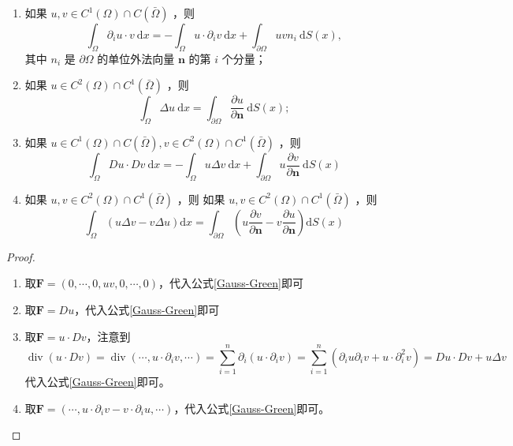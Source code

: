 \documentclass{mynote}
\begin{document}
\begin{corollary}
    \begin{enumerate}
        \item 如果 $u, v \in C^1(\Omega) \cap C(\bar{\Omega})$ ，则
        \begin{equation}
        \int_{\Omega} \partial_i u \cdot v \mathrm{~d} x=-\int_{\Omega} u\cdot \partial_i v \mathrm{~d} x+\int_{\partial \Omega} u v n_i \mathrm{~d} S(x),
        \label{eq:integration_by_parts_1}
        \end{equation}
        其中 $n_i$ 是 $\partial \Omega$ 的单位外法向量 $\boldsymbol{n}$ 的第 $i$ 个分量；
        \item 如果 $u \in C^2(\Omega) \cap C^1(\bar{\Omega})$ ，则
        \begin{equation}
        \int_{\Omega} \Delta u \mathrm{~d} x=\int_{\partial \Omega} \frac{\partial u}{\partial \boldsymbol{n}} \mathrm{~d} S(x) ;
        \label{eq:integration_by_parts_2}
        \end{equation}
        \item 如果 $u \in C^1(\Omega) \cap C(\bar{\Omega}), v \in C^2(\Omega) \cap C^1(\bar{\Omega})$ ，则
        \begin{equation}
        \int_{\Omega} D u \cdot D v \mathrm{~d} x=-\int_{\Omega} u \Delta v \mathrm{~d} x+\int_{\partial \Omega} u \frac{\partial v}{\partial \boldsymbol{n}} \mathrm{~d} S(x)
        \label{eq:integration_by_parts_3}
        \end{equation}
        \item 如果 $u, v \in C^2(\Omega) \cap C^1(\bar{\Omega})$ ，则
        如果 $u, v \in C^2(\Omega) \cap C^1(\bar{\Omega})$ ，则
        \begin{equation}
        \int_{\Omega}(u \Delta v-v \Delta u) \mathrm{d} x=\int_{\partial \Omega}\left(u \frac{\partial v}{\partial \boldsymbol{n}}-v \frac{\partial u}{\partial \boldsymbol{n}}\right) \mathrm{d} S(x)
        \label{eq:integration_by_parts_4}
        \end{equation}
    \end{enumerate}
\end{corollary}

\begin{proof}
    \begin{enumerate}
        \item 取$\boldsymbol{F}=(0,\cdots,0,uv,0,\cdots,0)$，代入公式\ref{Gauss-Green}即可
        \item 取$\boldsymbol{F}=Du$，代入公式\ref{Gauss-Green}即可
        \item 取$\boldsymbol{F}=u\cdot Dv$，注意到
        \[
            \operatorname{div}(u\cdot Dv)=\operatorname{div}(\cdots,u\cdot \partial_i v,\cdots)=\sum_{i=1}^n \partial_i (u\cdot \partial_i v)=\sum_{i=1}^n (\partial_i u\partial_i v+u\cdot \partial_i^2 v)=Du\cdot Dv+u\Delta v
        \]
        代入公式\ref{Gauss-Green}即可。
        \item 取$\boldsymbol{F}=(\cdots,u\cdot \partial_i v-v\cdot \partial_i u,\cdots)$，代入公式\ref{Gauss-Green}即可。
    \end{enumerate}
\end{proof}
\end{document}
